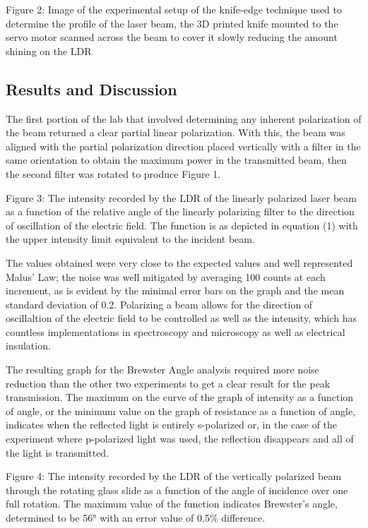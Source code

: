 \documentclass[11pt]{article}
\begin{document}
    Figure 2: Image of the experimental setup of the knife-edge technique
used to determine the profile of the laser beam, the 3D printed knife
mounted to the servo motor scanned across the beam to cover it slowly
reducing the amount shining on the LDR

    \hypertarget{results-and-discussion}{%
\subsection{Results and Discussion}\label{results-and-discussion}}

    The first portion of the lab that involved determining any inherent
polarization of the beam returned a clear partial linear polarization.
With this, the beam was aligned with the partial polarization direction
placed vertically with a filter in the same orientation to obtain the
maximum power in the transmitted beam, then the second filter was
rotated to produce Figure 1.

    Figure 3: The intensity recorded by the LDR of the linearly polarized
laser beam as a function of the relative angle of the linearly
polarizing filter to the direction of oscillation of the electric field.
The function is as depicted in equation (1) with the upper intensity
limit equivalent to the incident beam.

    The values obtained were very close to the expected values and well
represented Malus' Law; the noise was well mitigated by averaging 100
counts at each increment, as is evident by the minimal error bars on the
graph and the mean standard deviation of 0.2. Polarizing a beam allows
for the direction of oscillaltion of the electric field to be controlled
as well as the intensity, which has countless implementations in
spectroscopy and microscopy as well as electrical insulation.

    The resulting graph for the Brewster Angle analysis required more noise
reduction than the other two experiments to get a clear result for the
peak transmission. The maximum on the curve of the graph of intensity as
a function of angle, or the minimum value on the graph of resistance as
a function of angle, indicates when the reflected light is entirely
s-polarized or, in the case of the experiment where p-polarized light
was used, the reflection disappears and all of the light is transmitted.

    Figure 4: The intensity recorded by the LDR of the vertically polarized
beam through the rotating glass slide as a function of the angle of
incidence over one full rotation. The maximum value of the function
indicates Brewster's angle, determined to be 56° with an error value of
0.5\% difference.
\end{document}
